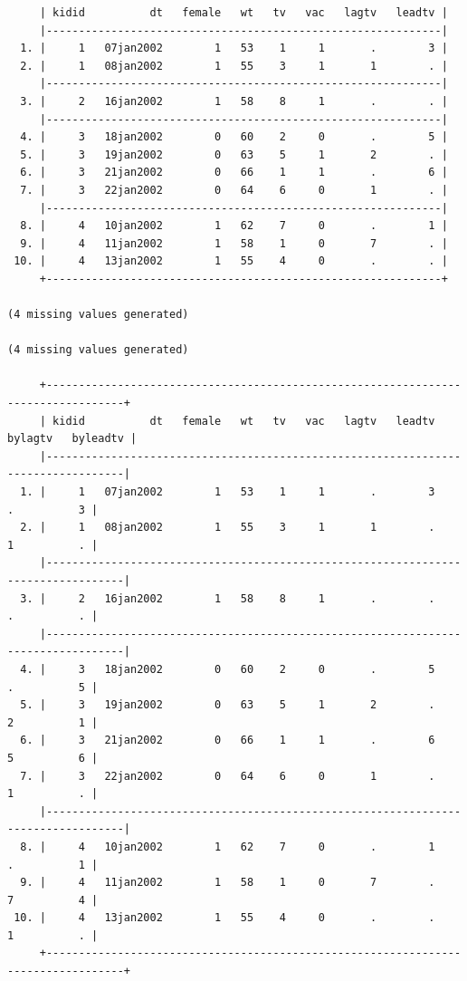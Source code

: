 \documentclass[
]{book}
\begin{document}
\begin{verbatim}
     | kidid          dt   female   wt   tv   vac   lagtv   leadtv |
     |-------------------------------------------------------------|
  1. |     1   07jan2002        1   53    1     1       .        3 |
  2. |     1   08jan2002        1   55    3     1       1        . |
     |-------------------------------------------------------------|
  3. |     2   16jan2002        1   58    8     1       .        . |
     |-------------------------------------------------------------|
  4. |     3   18jan2002        0   60    2     0       .        5 |
  5. |     3   19jan2002        0   63    5     1       2        . |
  6. |     3   21jan2002        0   66    1     1       .        6 |
  7. |     3   22jan2002        0   64    6     0       1        . |
     |-------------------------------------------------------------|
  8. |     4   10jan2002        1   62    7     0       .        1 |
  9. |     4   11jan2002        1   58    1     0       7        . |
 10. |     4   13jan2002        1   55    4     0       .        . |
     +-------------------------------------------------------------+

(4 missing values generated)

(4 missing values generated)

     +----------------------------------------------------------------------------------+
     | kidid          dt   female   wt   tv   vac   lagtv   leadtv   bylagtv   byleadtv |
     |----------------------------------------------------------------------------------|
  1. |     1   07jan2002        1   53    1     1       .        3         .          3 |
  2. |     1   08jan2002        1   55    3     1       1        .         1          . |
     |----------------------------------------------------------------------------------|
  3. |     2   16jan2002        1   58    8     1       .        .         .          . |
     |----------------------------------------------------------------------------------|
  4. |     3   18jan2002        0   60    2     0       .        5         .          5 |
  5. |     3   19jan2002        0   63    5     1       2        .         2          1 |
  6. |     3   21jan2002        0   66    1     1       .        6         5          6 |
  7. |     3   22jan2002        0   64    6     0       1        .         1          . |
     |----------------------------------------------------------------------------------|
  8. |     4   10jan2002        1   62    7     0       .        1         .          1 |
  9. |     4   11jan2002        1   58    1     0       7        .         7          4 |
 10. |     4   13jan2002        1   55    4     0       .        .         1          . |
     +----------------------------------------------------------------------------------+
\end{verbatim}
\end{document}
